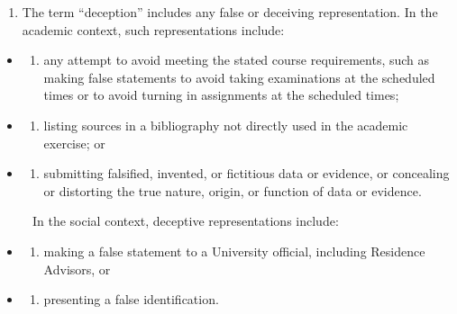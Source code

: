 \documentclass[
]{book}
\providecommand{\tightlist}{%
  \setlength{\itemsep}{0pt}\setlength{\parskip}{0pt}}
\begin{document}
\begin{enumerate}
\def\labelenumi{\arabic{enumi}.}
\setcounter{enumi}{3}
\tightlist
\item
  The term ``deception'' includes any false or deceiving representation. In the academic context, such representations include:
\end{enumerate}

\begin{itemize}
\item
  \begin{enumerate}
  \def\labelenumi{(\alph{enumi})}
  \tightlist
  \item
    any attempt to avoid meeting the stated course requirements, such as making false statements to avoid taking examinations at the scheduled times or to avoid turning in assignments at the scheduled times;
  \end{enumerate}
\item
  \begin{enumerate}
  \def\labelenumi{(\alph{enumi})}
  \setcounter{enumi}{1}
  \tightlist
  \item
    listing sources in a bibliography not directly used in the academic exercise; or
  \end{enumerate}
\item
  \begin{enumerate}
  \def\labelenumi{(\alph{enumi})}
  \setcounter{enumi}{2}
  \tightlist
  \item
    submitting falsified, invented, or fictitious data or evidence, or concealing or distorting the true nature, origin, or function of data or evidence.
  \end{enumerate}
\end{itemize}

~~~~~In the social context, deceptive representations include:

\begin{itemize}
\item
  \begin{enumerate}
  \def\labelenumi{(\alph{enumi})}
  \tightlist
  \item
    making a false statement to a University official, including Residence Advisors, or
  \end{enumerate}
\item
  \begin{enumerate}
  \def\labelenumi{(\alph{enumi})}
  \setcounter{enumi}{1}
  \tightlist
  \item
    presenting a false identification.
  \end{enumerate}
\end{itemize}
\end{document}
